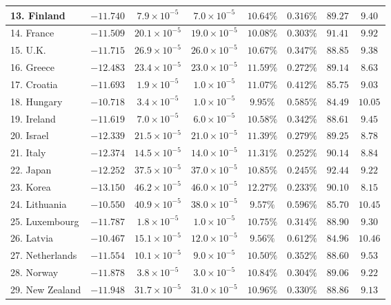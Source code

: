 \documentclass[12pt, titlepage]{article}%
\begin{document}
\begin{table}
\begin{center}
\begin{tabular}{||l|c|c|c|c|c|c|c||}
13. Finland &  $-11.740$ & $7.9\times10^{-5}$ & $7.0\times10^{-5}$ & $10.64\%$ & $0.316\%$ & $89.27$ & $9.40$\\ \hline
14. France &  $-11.509$ & $20.1\times10^{-5}$ & $19.0\times10^{-5}$ & $10.08\%$ & $0.303\%$ & $91.41$ & $9.92$\\ \hline
15. U.K. &  $-11.715$ & $26.9\times10^{-5}$ & $26.0\times10^{-5}$ & $10.67\%$ & $0.347\%$ & $88.85$ & $9.38$\\ \hline
16. Greece &  $-12.483$ & $23.4\times10^{-5}$ & $23.0\times10^{-5}$ & $11.59\%$ & $0.272\%$ & $89.14$ & $8.63$\\ \hline
17. Croatia &  $-11.693$ & $1.9\times10^{-5}$ & $1.0\times10^{-5}$ & $11.07\%$ & $0.412\%$ & $85.75$ & $9.03$\\ \hline
18. Hungary &  $-10.718$ & $3.4\times10^{-5}$ & $1.0\times10^{-5}$ & $9.95\%$ & $0.585\%$ & $84.49$ & $10.05$\\ \hline
19. Ireland &  $-11.619$ & $7.0\times10^{-5}$ & $6.0\times10^{-5}$ & $10.58\%$ & $0.342\%$ & $88.61$ & $9.45$\\ \hline
20. Israel &  $-12.339$ & $21.5\times10^{-5}$ & $21.0\times10^{-5}$ & $11.39\%$ & $0.279\%$ & $89.25$ & $8.78$\\ \hline
21. Italy &  $-12.374$ & $14.5\times10^{-5}$ & $14.0\times10^{-5}$ & $11.31\%$ & $0.252\%$ & $90.14$ & $8.84$\\ \hline
22. Japan &  $-12.252$ & $37.5\times10^{-5}$ & $37.0\times10^{-5}$ & $10.85\%$ & $0.245\%$ & $92.44$ & $9.22$\\ \hline
23. Korea &  $-13.150$ & $46.2\times10^{-5}$ & $46.0\times10^{-5}$ & $12.27\%$ & $0.233\%$ & $90.10$ & $8.15$\\ \hline
24. Lithuania &  $-10.550$ & $40.9\times10^{-5}$ & $38.0\times10^{-5}$ & $9.57\%$ & $0.596\%$ & $85.70$ & $10.45$\\ \hline
25. Luxembourg &  $-11.787$ & $1.8\times10^{-5}$ & $1.0\times10^{-5}$ & $10.75\%$ & $0.314\%$ & $88.90$ & $9.30$\\ \hline
26. Latvia &  $-10.467$ & $15.1\times10^{-5}$ & $12.0\times10^{-5}$ & $9.56\%$ & $0.612\%$ & $84.96$ & $10.46$\\ \hline
27. Netherlands &  $-11.554$ & $10.1\times10^{-5}$ & $9.0\times10^{-5}$ & $10.50\%$ & $0.352\%$ & $88.60$ & $9.53$\\ \hline
28. Norway &  $-11.878$ & $3.8\times10^{-5}$ & $3.0\times10^{-5}$ & $10.84\%$ & $0.304\%$ & $89.06$ & $9.22$\\ \hline
29. New Zealand &  $-11.948$ & $31.7\times10^{-5}$ & $31.0\times10^{-5}$ & $10.96\%$ & $0.330\%$ & $88.86$ & $9.13$\\ \hline

\end{tabular}
\end{center}
\end{table}
\end{document}
